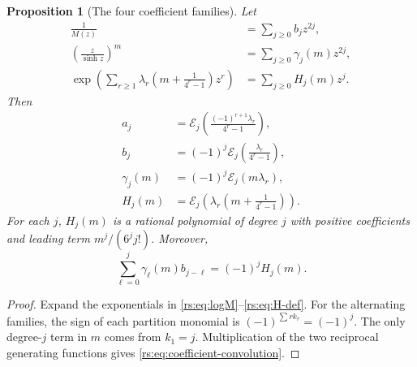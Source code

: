 \documentclass[11pt,a4paper,oneside,openany]{book}
\numberwithin{equation}{chapter}
\newtheorem{proposition}[theorem]{Proposition}
\theoremstyle{definition}
\theoremstyle{remark}
\begin{document}
\begin{proposition}[The four coefficient families]\label{rs:prop:coeff-families}
Let
\begin{align}
 \frac1{M(z)}&=\sum_{j\geq0}b_jz^{2j},\label{rs:eq:b-def}\\
 \left(\frac z{\sinh z}\right)^m&=
      \sum_{j\geq0}\gamma_j(m)z^{2j},\label{rs:eq:gamma-def}\\
 \exp\left(\sum_{r\geq1}\lambda_r
           \left(m+\frac1{4^r-1}\right)z^r\right)
      &=\sum_{j\geq0}H_j(m)z^j.\label{rs:eq:H-def}
\end{align}
Then
\begin{align}
 a_j&=\mathcal E_j\left(
        \frac{(-1)^{r+1}\lambda_r}{4^r-1}\right),\label{rs:eq:a-partition}\\
 b_j&=(-1)^j\mathcal E_j\left(\frac{\lambda_r}{4^r-1}\right),\label{rs:eq:b-partition}\\
 \gamma_j(m)&=(-1)^j\mathcal E_j(m\lambda_r),\label{rs:eq:gamma-partition}\\
 H_j(m)&=\mathcal E_j\left(\lambda_r
                     \left(m+\frac1{4^r-1}\right)\right).
 \label{rs:eq:H-partition}
\end{align}
For each $j$, $H_j(m)$ is a rational polynomial of degree $j$ with
positive coefficients and leading term $m^j/(6^j j!)$. Moreover,
\begin{equation}
 \sum_{\ell=0}^j\gamma_\ell(m)b_{j-\ell}=(-1)^jH_j(m).
 \label{rs:eq:coefficient-convolution}
\end{equation}
\end{proposition}
\begin{proof}
Expand the exponentials in \eqref{rs:eq:logM}--\eqref{rs:eq:H-def}.
For the alternating families, the sign of each partition monomial
is $(-1)^{\sum rk_r}=(-1)^j$. The only degree-$j$ term in $m$ comes
from $k_1=j$. Multiplication of the two reciprocal generating
functions gives \eqref{rs:eq:coefficient-convolution}.
\end{proof}
\end{document}
